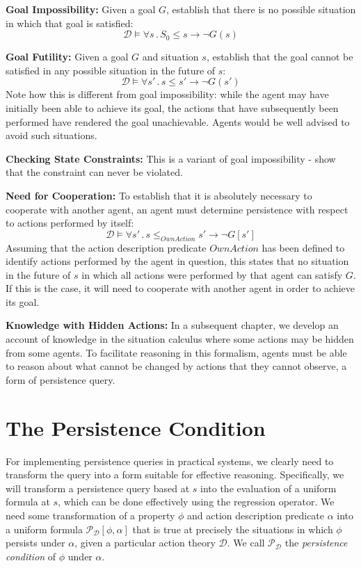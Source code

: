 \textbf{Goal Impossibility:} Given a goal $G$, establish that there
is no possible situation in which that goal is satisfied:\[
\mathcal{D}\models\forall s\,.\, S_{0}\leq s\rightarrow\neg G(s)\]


\textbf{Goal Futility:} Given a goal $G$ and situation $s$, establish
that the goal cannot be satisfied in any possible situation in the
future of $s$:\[
\mathcal{D}\models\forall s'\,.\, s\leq s'\rightarrow\neg G(s')\]
 Note how this is different from goal impossibility: while the agent
may have initially been able to achieve its goal, the actions that
have subsequently been performed have rendered the goal unachievable.
Agents would be well advised to avoid such situations.

\textbf{Checking State Constraints:} This is a variant of goal impossibility
- show that the constraint can never be violated.

\textbf{Need for Cooperation:} To establish that it is absolutely
necessary to cooperate with another agent, an agent must determine
persistence with respect to actions performed by itself:\[
\mathcal{D}\models\forall s'\,.\, s\leq_{OwnAction}s'\rightarrow\neg G[s']\]
 Assuming that the action description predicate $OwnAction$ has been
defined to identify actions performed by the agent in question, this
states that no situation in the future of $s$ in which all actions
were performed by that agent can satisfy $G$. If this is the case,
it will need to cooperate with another agent in order to achieve its
goal.

\textbf{Knowledge with Hidden Actions:} In a subsequent chapter, we
develop an account of knowledge in the situation calculus where some
actions may be hidden from some agents. To facilitate reasoning in
this formalism, agents must be able to reason about what cannot be
changed by actions that they cannot observe, a form of persistence
query.


\section{The Persistence Condition}

For implementing persistence queries in practical systems, we clearly
need to transform the query into a form suitable for effective reasoning.
Specifically, we will transform a persistence query based at $s$
into the evaluation of a uniform formula at $s$, which can be done
effectively using the regression operator. We need some transformation
of a property $\phi$ and action description predicate $\alpha$ into
a uniform formula $\mathcal{P}_{\mathcal{D}}[\phi,\alpha]$ that is
true at precisely the situations in which $\phi$ persists under $\alpha$,
given a particular action theory $\mathcal{D}$. We call $\mathcal{P}_{\mathcal{D}}$
the \emph{persistence condition} of $\phi$ under $\alpha$.

